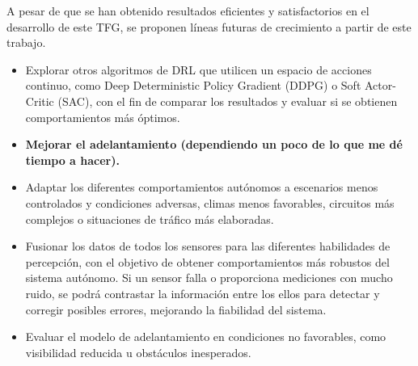 A pesar de que se han obtenido resultados eficientes y satisfactorios en el desarrollo de este \ac{TFG}, se proponen líneas futuras de crecimiento a partir de este trabajo. 
\begin{itemize}
\item Explorar otros algoritmos de \ac{DRL} que utilicen un espacio de acciones continuo, como Deep Deterministic Policy Gradient (DDPG) o Soft Actor-Critic (SAC), con el fin de comparar los resultados y evaluar si se obtienen comportamientos más óptimos.
\item \textbf{Mejorar el adelantamiento (dependiendo un poco de lo que me dé tiempo a hacer).}
\item Adaptar los diferentes comportamientos autónomos a escenarios menos controlados y condiciones adversas, climas menos favorables, circuitos más complejos o situaciones de tráfico más elaboradas.
\item Fusionar los datos de todos los sensores para las diferentes habilidades de percepción, con el objetivo de obtener comportamientos más robustos del sistema autónomo. Si un sensor falla o proporciona mediciones con mucho ruido, se podrá contrastar la información entre los ellos para detectar y corregir posibles errores, mejorando la fiabilidad del sistema.
\item Evaluar el modelo de adelantamiento en condiciones no favorables, como visibilidad reducida u obstáculos inesperados.
\end{itemize}

